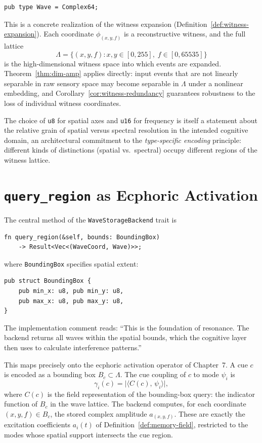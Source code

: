 \documentclass[12pt, oneside]{book}
\theoremstyle{plain}
\theoremstyle{definition}
\theoremstyle{remark}
\begin{document}
\begin{verbatim}
pub type Wave = Complex64;
\end{verbatim}

This is a concrete realization of the witness expansion
(Definition~\ref{def:witness-expansion}).
Each coordinate $\phi_{(x,y,f)}$ is a reconstructive witness,
and the full lattice
\[
  \Lambda = \{(x, y, f) : x,y \in [0,255],\; f \in [0,65535]\}
\]
is the high-dimensional witness space into which events are
expanded.
Theorem~\ref{thm:dim-amp} applies directly: input events that are
not linearly separable in raw sensory space may become separable
in $\Lambda$ under a nonlinear embedding, and
Corollary~\ref{cor:witness-redundancy} guarantees robustness to
the loss of individual witness coordinates.

The choice of \texttt{u8} for spatial axes and \texttt{u16} for
frequency is itself a statement about the relative grain of
spatial versus spectral resolution in the intended cognitive
domain, an architectural commitment to the
\emph{type-specific encoding} principle: different kinds of
distinctions (spatial vs.\ spectral) occupy different regions
of the witness lattice.

\section{\texttt{query\_region} as Ecphoric Activation}

The central method of the \texttt{WaveStorageBackend} trait is

\begin{verbatim}
fn query_region(&self, bounds: BoundingBox)
    -> Result<Vec<(WaveCoord, Wave)>>;
\end{verbatim}

\noindent
where \texttt{BoundingBox} specifies spatial extent:

\begin{verbatim}
pub struct BoundingBox {
    pub min_x: u8, pub min_y: u8,
    pub max_x: u8, pub max_y: u8,
}
\end{verbatim}

\noindent
The implementation comment reads: ``This is the foundation of
resonance. The backend returns all waves within the spatial
bounds, which the cognitive layer then uses to calculate
interference patterns.''

This maps precisely onto the ecphoric activation operator
of Chapter~7.
A cue $c$ is encoded as a bounding box
$B_c \subset \Lambda$.
The cue coupling of $c$ to mode $\psi_i$ is
\[
  \gamma_i(c) = \bigl|\langle C(c),\, \psi_i \rangle\bigr|,
\]
where $C(c)$ is the field representation of the bounding-box
query: the indicator function of $B_c$ in the wave lattice.
The backend computes, for each coordinate $(x,y,f) \in B_c$,
the stored complex amplitude $a_{(x,y,f)}$.
These are exactly the excitation coefficients $a_i(t)$
of Definition~\ref{def:memory-field}, restricted to the modes
whose spatial support intersects the cue region.
\end{document}
